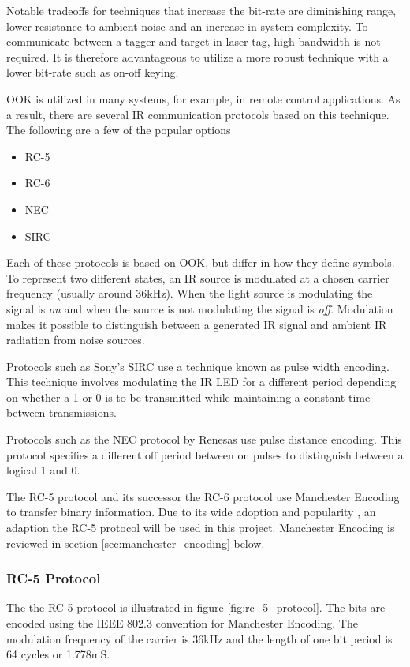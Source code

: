 Notable tradeoffs for techniques that increase the bit-rate are diminishing range, lower resistance to ambient noise and an increase in system complexity. To communicate between a tagger and target in laser tag, high bandwidth is not required. It is therefore advantageous to utilize a more robust technique with a lower bit-rate such as on-off keying.

OOK is utilized in many systems, for example, in remote control applications. As a result, there are several IR communication protocols based on this technique. The following are a few of the popular options

\begin{itemize}
	\item RC-5
	\item RC-6
	\item NEC
	\item SIRC
\end{itemize}

Each of these protocols is based on OOK, but differ in how they define symbols. To represent two different states, an IR source is modulated at a chosen carrier frequency (usually around 36kHz). When the light source is modulating the signal is \textit{on} and when the source is not modulating the signal is \textit{off}.  Modulation makes it possible to distinguish between a generated IR signal and ambient IR radiation from noise sources.

Protocols such as Sony's SIRC use a technique known as pulse width encoding. This technique involves modulating the IR LED for a different period depending on whether a 1 or 0 is to be transmitted while maintaining a constant time between transmissions.

Protocols such as the NEC protocol by Renesas use pulse distance encoding. This protocol specifies a different off period between on pulses to distinguish between a logical 1 and 0.

The RC-5 protocol and its successor the RC-6 protocol use Manchester Encoding to transfer binary information. Due to its wide adoption and popularity \cite{rudrappa2009}, an adaption the RC-5 protocol will be used in this project. Manchester Encoding is reviewed in section \ref{sec:manchester_encoding} below.

\subsubsection{RC-5 Protocol}
\label{sec:rc_5_protocol}
The the RC-5 protocol is illustrated in figure \ref{fig:rc_5_protocol}. The bits are encoded using the IEEE 802.3 convention for Manchester Encoding. The modulation frequency of the carrier is 36kHz and the length of one bit period is 64 cycles or 1.778mS\cite{Perme2007}.

